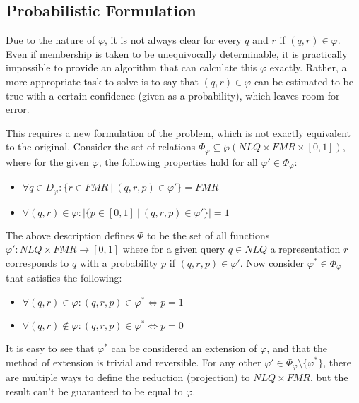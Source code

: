 \documentclass[12pt]{article}
\begin{document}
\subsection{Probabilistic Formulation}

Due to the nature of $\varphi$, it is not always clear for every $q$ and $r$ if $(q,r) \in \varphi$. Even if membership is taken to be unequivocally determinable, it is practically impossible to provide an algorithm that can calculate this $\varphi$ exactly. Rather, a more appropriate task to solve is to say that $(q,r) \in \varphi$ can be estimated to be true with a certain confidence (given as a probability), which leaves room for error.

This requires a new formulation of the problem, which is not exactly equivalent to the original. Consider the set of relations $\Phi_{\varphi} \subseteq \wp(NLQ \times FMR \times [0,1])$, where for the given $\varphi$, the following properties hold for all $\varphi' \in \Phi_{\varphi}$:

\begin{itemize}[noitemsep]
	\item $\forall q \in D_{\varphi} : \{ r \in FMR \ | \ (q,r,p) \in \varphi' \} = FMR$
	\item $\forall (q, r) \in \varphi : |\{ p \in [0,1] \ | \ (q,r,p) \in \varphi' \}| = 1 $
\end{itemize}

The above description defines $\Phi$ to be the set of all functions $\varphi' : NLQ \times FMR \to [0,1]$ where for a given query $q \in NLQ$ a representation $r$ corresponds to $q$ with a probability $p$ if $(q,r,p) \in \varphi'$. Now consider $\varphi^{*} \in \Phi_{\varphi}$ that satisfies the following:

\begin{itemize}[noitemsep]
	\item $\forall (q,r) \in \varphi : (q, r, p) \in \varphi^{*} \iff p = 1$
	\item $\forall (q,r) \notin \varphi : (q, r, p) \in \varphi^{*} \iff p = 0$
\end{itemize}

It is easy to see that $\varphi^{*}$ can be considered an extension of $\varphi$, and that the method of extension is trivial and reversible. For any other $\varphi' \in \Phi_{\varphi} \setminus \{\varphi^{*}\}$, there are multiple ways to define the reduction (projection) to $NLQ \times FMR$, but the result can't be guaranteed to be equal to $\varphi$.
\end{document}
